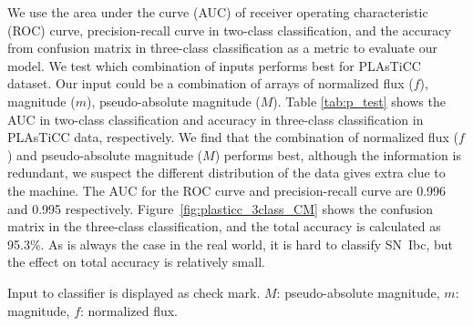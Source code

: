 \documentclass[proof]{pasj01}
\begin{document}
We use the area under the curve (AUC) of receiver operating characteristic (ROC) curve, precision-recall curve in two-class classification, and the accuracy from confusion matrix in three-class classification as a metric to evaluate our model.
We test which combination of inputs performs best for PLAsTiCC dataset. Our input could be a combination of arrays of normalized flux ($f$), magnitude ($m$), pseudo-absolute magnitude ($M$).
Table \ref{tab:p_test} shows the AUC in two-class classification and accuracy in three-class classification in PLAsTiCC data, respectively.
We find that the combination of normalized flux ($f$) and pseudo-absolute magnitude ($M$) performs best, although the information is redundant, we suspect the different distribution of the data gives extra clue to the machine.
The AUC for the ROC curve and precision-recall curve are 0.996 and 0.995 respectively.
Figure\ \ref{fig:plasticc_3class_CM} shows the confusion matrix in the three-class classification, and the total accuracy is calculated as 95.3\%.
As is always the case in the real world, it is hard to classify SN~Ibc, but the effect on total accuracy is relatively small.
%
\begin{table}[htbp]
\label{tab:p_test}
\begin{tabnote}
\footnotemark[$*$] Input to classifier is displayed as check mark. $M$: pseudo-absolute magnitude, $m$: magnitude, $f$: normalized flux.
\end{tabnote}
\end{table}
\end{document}
